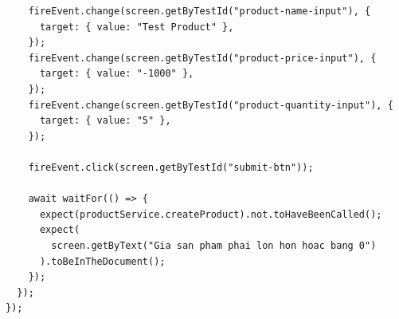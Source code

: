 \documentclass[a4paper,12pt]{article}
\begin{document}
\begin{tcolorbox}[breakable, colback=green!5,colframe=black!50,title=Product Form Integration Test]
\begin{lstlisting}
    fireEvent.change(screen.getByTestId("product-name-input"), {
      target: { value: "Test Product" },
    });
    fireEvent.change(screen.getByTestId("product-price-input"), {
      target: { value: "-1000" },
    });
    fireEvent.change(screen.getByTestId("product-quantity-input"), {
      target: { value: "5" },
    });

    fireEvent.click(screen.getByTestId("submit-btn"));

    await waitFor(() => {
      expect(productService.createProduct).not.toHaveBeenCalled();
      expect(
        screen.getByText("Gia san pham phai lon hon hoac bang 0")
      ).toBeInTheDocument();
    });
  });
});
\end{lstlisting}
\end{tcolorbox}
\end{document}
